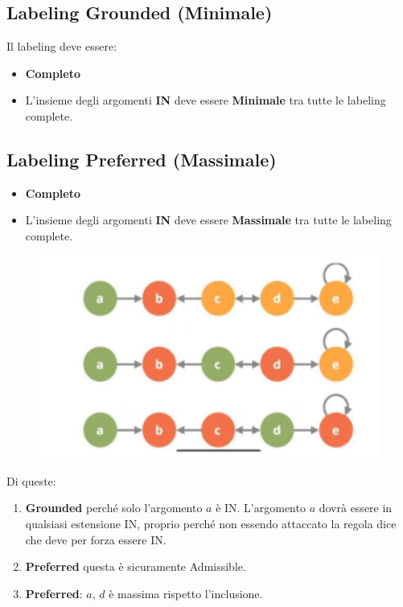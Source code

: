 \subsection{Labeling Grounded (Minimale)}
Il labeling deve essere:
\begin{itemize}
    \item \textbf{Completo}
    \item L'insieme degli argomenti \textbf{IN} deve essere
          \textbf{Minimale} tra tutte le labeling complete.
\end{itemize}
\subsection{Labeling Preferred (Massimale)}
\begin{itemize}
    \item \textbf{Completo}
    \item L'insieme degli argomenti \textbf{IN} deve essere
          \textbf{Massimale} tra tutte le labeling complete.
\end{itemize}
\begin{figure}[H]
    \centering
    \includegraphics[width=12cm, keepaspectratio]{capitoli/img/Cap7/GR.png}
\end{figure}
Di queste:
\begin{enumerate}
    \item \textbf{Grounded} perché solo l'argomento $a$ è IN. L'argomento
          $a$ dovrà essere in qualsiasi estensione IN, proprio perché non essendo
          attaccato la regola dice che deve per forza essere IN.
    \item \textbf{Preferred} questa è sicuramente Admissible.
    \item \textbf{Preferred}: $a$, $d$ è massima rispetto l'inclusione.
\end{enumerate}

